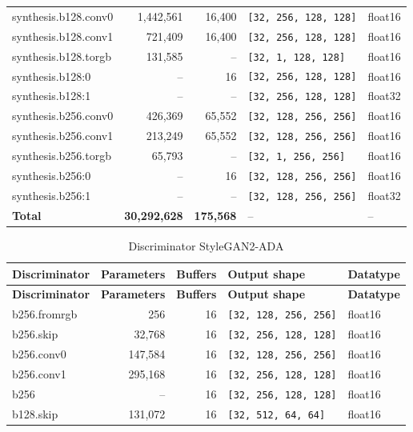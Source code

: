 \begin{footnotesize}
\begin{longtable}{@{}lrrll@{}}
synthesis.b128.conv0 & 1{,}442{,}561 & 16{,}400 & \texttt{[32, 256, 128, 128]} & float16 \\
synthesis.b128.conv1 & 721{,}409 & 16{,}400 & \texttt{[32, 256, 128, 128]} & float16 \\
synthesis.b128.torgb & 131{,}585 & --     & \texttt{[32, 1, 128, 128]}    & float16 \\
synthesis.b128:0     & --        & 16     & \texttt{[32, 256, 128, 128]}  & float16 \\
synthesis.b128:1     & --        & --     & \texttt{[32, 256, 128, 128]}  & float32 \\
synthesis.b256.conv0 & 426{,}369 & 65{,}552 & \texttt{[32, 128, 256, 256]} & float16 \\
synthesis.b256.conv1 & 213{,}249 & 65{,}552 & \texttt{[32, 128, 256, 256]} & float16 \\
synthesis.b256.torgb & 65{,}793  & --     & \texttt{[32, 1, 256, 256]}    & float16 \\
synthesis.b256:0     & --        & 16     & \texttt{[32, 128, 256, 256]}  & float16 \\
synthesis.b256:1     & --        & --     & \texttt{[32, 128, 256, 256]}  & float32 \\
\midrule
\textbf{Total}       & \textbf{30{,}292{,}628} & \textbf{175{,}568} & -- & -- \\
\bottomrule
\end{longtable}
\newpage
\begin{longtable}{@{}lrrll@{}}
\caption{Discriminator StyleGAN2-ADA}\\
\toprule
\textbf{Discriminator} & \textbf{Parameters} & \textbf{Buffers} & \textbf{Output shape} & \textbf{Datatype} \\
\midrule
\endfirsthead
\toprule
\textbf{Discriminator} & \textbf{Parameters} & \textbf{Buffers} & \textbf{Output shape} & \textbf{Datatype} \\
\midrule
\endhead
b256.fromrgb   & 256      & 16  & \texttt{[32, 128, 256, 256]} & float16 \\
b256.skip      & 32{,}768 & 16  & \texttt{[32, 256, 128, 128]} & float16 \\
b256.conv0     & 147{,}584 & 16 & \texttt{[32, 128, 256, 256]} & float16 \\
b256.conv1     & 295{,}168 & 16 & \texttt{[32, 256, 128, 128]} & float16 \\
b256           & --       & 16  & \texttt{[32, 256, 128, 128]} & float16 \\
b128.skip      & 131{,}072 & 16 & \texttt{[32, 512, 64, 64]}   & float16 \\

\end{longtable}
\end{footnotesize}
